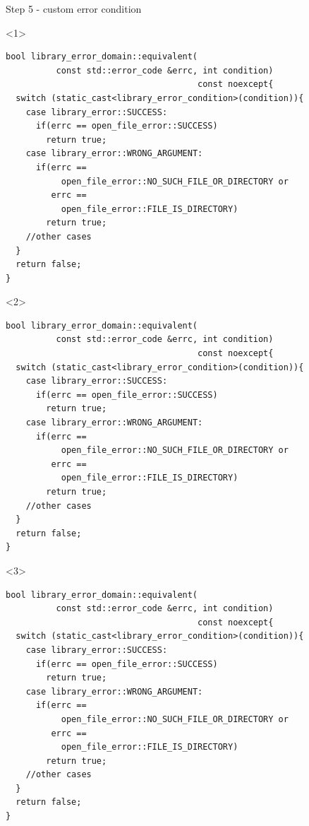 \documentclass[10pt]{beamer}
\begin{document}
\begin{frame}[fragile]{Step 5 - custom error condition}
	\begin{onlyenv}
	\begin{verbatim}
bool library_error_domain::equivalent(
          const std::error_code &errc, int condition) 
                                      const noexcept{                     
  switch (static_cast<library_error_condition>(condition)){
    case library_error::SUCCESS:
      if(errc == open_file_error::SUCCESS)
        return true;
    case library_error::WRONG_ARGUMENT:
      if(errc == 
           open_file_error::NO_SUCH_FILE_OR_DIRECTORY or
         errc == 
           open_file_error::FILE_IS_DIRECTORY)
        return true;
    //other cases    
  }
  return false;
}
	\end{verbatim}
	\end{onlyenv}

	\begin{onlyenv}
	\begin{verbatim}
bool library_error_domain::equivalent(
          const std::error_code &errc, int condition) 
                                      const noexcept{                     
  switch (static_cast<library_error_condition>(condition)){
    case library_error::SUCCESS:
      if(errc == open_file_error::SUCCESS)
        return true;
    case library_error::WRONG_ARGUMENT:
      if(errc == 
           open_file_error::NO_SUCH_FILE_OR_DIRECTORY or
         errc == 
           open_file_error::FILE_IS_DIRECTORY)
        return true;
    //other cases    
  }
  return false;
}
	\end{verbatim}
	\end{onlyenv}

	\begin{onlyenv}
	\begin{verbatim}
bool library_error_domain::equivalent(
          const std::error_code &errc, int condition) 
                                      const noexcept{                     
  switch (static_cast<library_error_condition>(condition)){
    case library_error::SUCCESS:
      if(errc == open_file_error::SUCCESS)
        return true;
    case library_error::WRONG_ARGUMENT:
      if(errc == 
           open_file_error::NO_SUCH_FILE_OR_DIRECTORY or
         errc == 
           open_file_error::FILE_IS_DIRECTORY)
        return true;
    //other cases    
  }
  return false;
}
	\end{verbatim}
	\end{onlyenv}
\end{frame}
\end{document}
